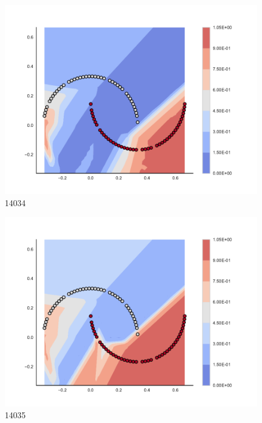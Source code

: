 \begin{subfigure}[b]{0.09\textwidth}
    \includegraphics[clip, trim=2.35cm 1.75cm 4.5cm 0cm,width=\textwidth]{img/convergence/14034.pdf}
    \caption{14034}
    \label{fig:convergence_14034}
\end{subfigure}
%
\begin{subfigure}[b]{0.09\textwidth}
    \includegraphics[clip, trim=2.35cm 1.75cm 4.5cm 0cm,width=\textwidth]{img/convergence/14035.pdf}
    \caption{14035}
    \label{fig:convergence_14035}
\end{subfigure}
%
